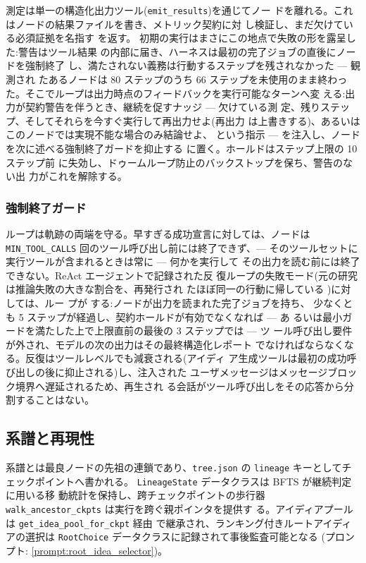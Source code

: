測定は単一の構造化出力ツール(\texttt{emit\_results})を通じてノー
ドを離れる。これはノードの結果ファイルを書き、メトリック契約に対
し検証し、まだ欠けている必須証拠を名指す を返す。
初期の実行はまさにこの地点で失敗の形を露呈した:警告はツール結果
の内部に届き、ハーネスは最初の完了ジョブの直後にノードを強制終了
し、満たされない義務は行動するステップを残されなかった — 観測され
たあるノードは 80 ステップのうち 66 ステップを未使用のまま終わっ
た。そこでループは出力時点のフィードバックを実行可能なターンへ変
える:出力が契約警告を伴うとき、継続を促すナッジ — 欠けている測
定、残りステップ、そしてそれらを今すぐ実行して再出力せよ(再出力
は上書きする)、あるいはこのノードでは実現不能な場合のみ結論せよ、
という指示 — を注入し、ノードを次に述べる強制終了ガードを抑止する
に置く。ホールドはステップ上限の 10 ステップ前
に失効し、ドゥームループ防止のバックストップを保ち、警告のない出
力がこれを解除する。

\subsubsection*{強制終了ガード}

ループは軌跡の両端を守る。早すぎる成功宣言に対しては、ノードは
\texttt{MIN\_TOOL\_CALLS} 回のツール呼び出し前には終了できず、—
そのツールセットに実行ツールが含まれるときは常に — 何かを実行して
その出力を読む前には終了できない。ReAct エージェントで記録された反
復ループの失敗モード(元の研究は推論失敗の大きな割合を、再発行され
たほぼ同一の行動に帰している \cite{yao2023react})に対しては、ルー
プが する:ノードが出力を読まれた完了ジョブを持ち、
少なくとも 5 ステップが経過し、契約ホールドが有効でなくなれば — あ
るいは最小ガードを満たした上で上限直前の最後の 3 ステップでは — ツ
ール呼び出し要件が外され、モデルの次の出力はその最終構造化レポート
でなければならなくなる。反復はツールレベルでも減衰される(アイディ
ア生成ツールは最初の成功呼び出しの後に抑止される)し、注入された
ユーザメッセージはメッセージブロック境界へ遅延されるため、再生され
る会話がツール呼び出しをその応答から分割することはない。

\subsection{系譜と再現性}\label{sec:exploration:lineage}

系譜とは最良ノードの先祖の連鎖であり、\texttt{tree.json} の
\texttt{lineage} キーとしてチェックポイントへ書かれる。
\texttt{LineageState} データクラスは BFTS が継続判定に用いる移
動統計を保持し、跨チェックポイントの歩行器
\texttt{walk\_ancestor\_ckpts} は実行を跨ぐ親ポインタを提供す
る。アイディアプールは \texttt{get\_idea\_pool\_for\_ckpt} 経由
で継承され、ランキング付きルートアイディアの選択は
\texttt{RootChoice} データクラスに記録されて事後監査可能となる
(プロンプト: \cref{prompt:root_idea_selector})。

